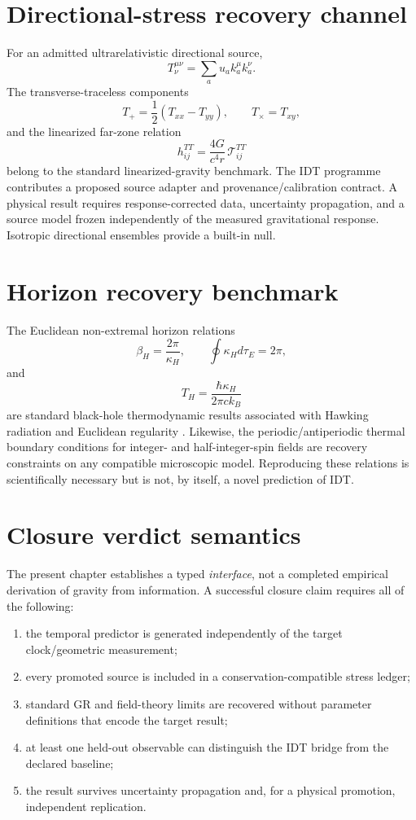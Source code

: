 \documentclass[11pt]{book}
\begin{document}
\section{Directional-stress recovery channel}

For an admitted ultrarelativistic directional source,
\[
T_\nu^{\mu\nu}
=
\sum_a u_a k_a^\mu k_a^\nu.
\]
The transverse-traceless components
\[
T_+=\frac12(T_{xx}-T_{yy}),
\qquad
T_\times=T_{xy},
\]
and the linearized far-zone relation
\[
\boxed{
h_{ij}^{TT}
=
\frac{4G}{c^4r}\,\mathcal T_{ij}^{TT}
}
\]
belong to the standard linearized-gravity benchmark. The IDT programme contributes a proposed source adapter and provenance/calibration contract. A physical result requires response-corrected data, uncertainty propagation, and a source model frozen independently of the measured gravitational response. Isotropic directional ensembles provide a built-in null.

\section{Horizon recovery benchmark}

The Euclidean non-extremal horizon relations
\[
\beta_H=\frac{2\pi}{\kappa_H},
\qquad
\oint\kappa_Hd\tau_E=2\pi,
\]
and
\[
\boxed{
T_H=\frac{\hbar\kappa_H}{2\pi c k_B}
}
\]
are standard black-hole thermodynamic results associated with Hawking radiation and Euclidean regularity \cite{Hawking1975,GibbonsHawking1977}. Likewise, the periodic/antiperiodic thermal boundary conditions for integer- and half-integer-spin fields are recovery constraints on any compatible microscopic model. Reproducing these relations is scientifically necessary but is not, by itself, a novel prediction of IDT.

\section{Closure verdict semantics}

The present chapter establishes a typed \emph{interface}, not a completed empirical derivation of gravity from information. A successful closure claim requires all of the following:
\begin{enumerate}
\item the temporal predictor is generated independently of the target clock/geometric measurement;
\item every promoted source is included in a conservation-compatible stress ledger;
\item standard GR and field-theory limits are recovered without parameter definitions that encode the target result;
\item at least one held-out observable can distinguish the IDT bridge from the declared baseline;
\item the result survives uncertainty propagation and, for a physical promotion, independent replication.
\end{enumerate}
\end{document}
